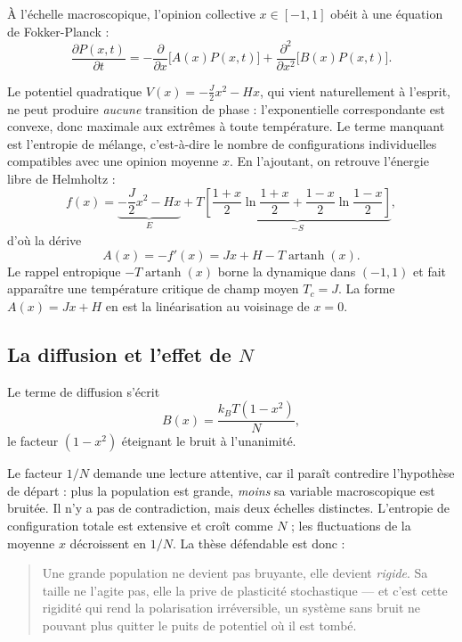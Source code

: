 \documentclass[11pt,a4paper]{article}
\begin{document}
À l'échelle macroscopique, l'opinion collective $x \in [-1,1]$ obéit à une équation de
Fokker-Planck \citep{risken1989} :
\begin{equation}
\frac{\partial P(x,t)}{\partial t}
= -\frac{\partial}{\partial x}\big[A(x)P(x,t)\big]
+ \frac{\partial^2}{\partial x^2}\big[B(x)P(x,t)\big].
\end{equation}

Le potentiel quadratique $V(x) = -\frac{J}{2}x^2 - Hx$, qui vient naturellement à l'esprit,
ne peut produire \emph{aucune} transition de phase : l'exponentielle correspondante est
convexe, donc maximale aux extrêmes à toute température. Le terme manquant est l'entropie
de mélange, c'est-à-dire le nombre de configurations individuelles compatibles avec une
opinion moyenne $x$. En l'ajoutant, on retrouve l'énergie libre de Helmholtz :
\begin{equation}
f(x) = \underbrace{-\frac{J}{2}x^2 - Hx}_{E}
+ T\underbrace{\left[\frac{1+x}{2}\ln\frac{1+x}{2}
+ \frac{1-x}{2}\ln\frac{1-x}{2}\right]}_{-S},
\label{eq:libre}
\end{equation}
d'où la dérive
\begin{equation}
A(x) = -f'(x) = Jx + H - T\operatorname{artanh}(x).
\label{eq:derive}
\end{equation}
Le rappel entropique $-T\operatorname{artanh}(x)$ borne la dynamique dans $(-1,1)$ et fait
apparaître une température critique de champ moyen $T_c = J$. La forme $A(x) = Jx + H$ en
est la linéarisation au voisinage de $x = 0$.

\subsection{La diffusion et l'effet de $N$}

Le terme de diffusion s'écrit
\begin{equation}
B(x) = \frac{k_B T (1-x^2)}{N},
\label{eq:diffusion}
\end{equation}
le facteur $(1-x^2)$ éteignant le bruit à l'unanimité.

Le facteur $1/N$ demande une lecture attentive, car il paraît contredire l'hypothèse de
départ : plus la population est grande, \emph{moins} sa variable macroscopique est bruitée.
Il n'y a pas de contradiction, mais deux échelles distinctes. L'entropie de configuration
totale est extensive et croît comme $N$ ; les fluctuations de la moyenne $x$ décroissent en
$1/N$. La thèse défendable est donc :

\begin{quote}
Une grande population ne devient pas bruyante, elle devient \emph{rigide}. Sa taille ne
l'agite pas, elle la prive de plasticité stochastique --- et c'est cette rigidité qui rend
la polarisation irréversible, un système sans bruit ne pouvant plus quitter le puits de
potentiel où il est tombé.
\end{quote}
\end{document}
